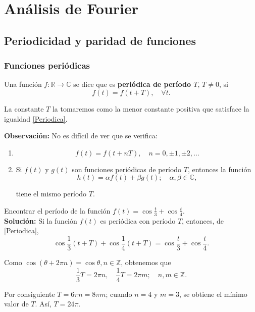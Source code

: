 \chapter{Análisis de Fourier}

\section{Periodicidad y paridad de funciones}

\subsection{Funciones periódicas}

\begin{defi}
Una función $f: \mathbb{R} \longrightarrow \mathbb{C} $ se dice que es \textbf{periódica de período $T$}, $T\neq 0$, si 
\begin{equation}
f(t) = f(t +T ), \quad \forall t.    \label{Periodica}
\end{equation}

La constante $T$ la tomaremos como la  menor constante positiva que satisface la igualdad \eqref{Periodica}.
\end{defi}

\textbf{Observación:} No es difícil de ver que se verifica:

\begin{enumerate}
    \item $$f(t) = f(t + nT), \quad n = 0, \pm 1, \pm 2, \dots$$
    
    \item Si $f(t)$ y $g(t)$ son funciones periódicas de período $T$, entonces la función
    $$h(t) = \alpha f(t) + \beta g(t); \quad \alpha, \beta \in \mathbb{C},$$
    
    tiene el mismo período $T$.
\end{enumerate}

\begin{ejemplo}
Encontrar el período de la función $f(t) = \cos \frac{t}{3} + \cos \frac{t}{4}$.
\\

\textbf{Solución:} Si la función $f(t)$ es periódica con período $T$, entonces, de \eqref{Periodica},
$$\cos \frac{1}{3}(t + T) + \cos \frac{1}{4}(t + T) = \cos \frac{t}{3} + \cos \frac{t}{4}.$$

Como $\cos(\theta + 2\pi n) = \cos \theta, n \in \mathbb{Z}$, obtenemos que 
$$\frac{1}{3} T = 2\pi n, \quad \frac{1}{4}T = 2\pi m; \quad n,m \in \mathbb{Z}.$$

Por consiguiente $T = 6\pi n = 8\pi m$; cuando $n = 4$ y $m=3$, se obtiene el mínimo valor de $T$. Así, $T = 24\pi$.
\end{ejemplo}

